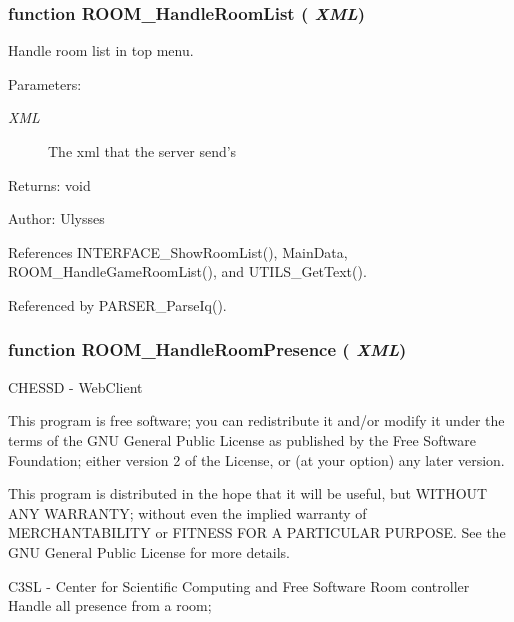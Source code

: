 \subsubsection{\setlength{\rightskip}{0pt plus 5cm}function ROOM\_\-HandleRoomList ( {\em XML})}\label{room_2room_8js_e60c68aa283c093e99208aa162fbadf4}


Handle room list in top menu.

\begin{Desc}
\item[Parameters:]
\begin{description}
\item[{\em XML}]The xml that the server send's \end{description}
\end{Desc}
\begin{Desc}
\item[Returns:]void \end{Desc}
\begin{Desc}
\item[Author:]Ulysses \end{Desc}


References INTERFACE\_\-ShowRoomList(), MainData, ROOM\_\-HandleGameRoomList(), and UTILS\_\-GetText().

Referenced by PARSER\_\-ParseIq().
\subsubsection{\setlength{\rightskip}{0pt plus 5cm}function ROOM\_\-HandleRoomPresence ( {\em XML})}\label{room_2room_8js_52799481e66372e148ff1ee3bac60618}


CHESSD - WebClient

This program is free software; you can redistribute it and/or modify it under the terms of the GNU General Public License as published by the Free Software Foundation; either version 2 of the License, or (at your option) any later version.

This program is distributed in the hope that it will be useful, but WITHOUT ANY WARRANTY; without even the implied warranty of MERCHANTABILITY or FITNESS FOR A PARTICULAR PURPOSE. See the GNU General Public License for more details.

C3SL - Center for Scientific Computing and Free Software Room controller Handle all presence from a room;

